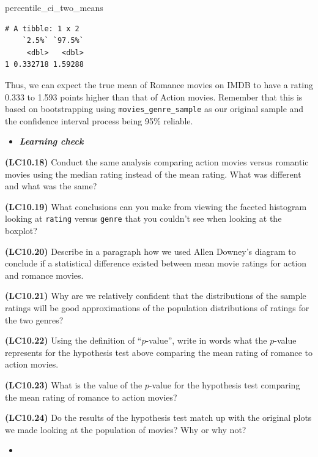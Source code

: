 \documentclass[12pt, krantz2,]{krantz}
\makeatletter
\newenvironment{Shaded}{\begin{snugshade}}{\end{snugshade}}
\newcommand{\NormalTok}[1]{#1}
\newenvironment{kframe}{%
\medskip{}
\setlength{\fboxsep}{.8em}
 \def\at@end@of@kframe{}%
 \ifinner\ifhmode%
  \def\at@end@of@kframe{\end{minipage}}%
  \begin{minipage}{\columnwidth}%
 \fi\fi%
 \def\FrameCommand##1{\hskip\@totalleftmargin \hskip-\fboxsep
 \colorbox{shadecolor}{##1}\hskip-\fboxsep
     \hskip-\linewidth \hskip-\@totalleftmargin \hskip\columnwidth}%
 \MakeFramed {\advance\hsize-\width
   \@totalleftmargin\z@ \linewidth\hsize
   \@setminipage}}%
 {\par\unskip\endMakeFramed%
 \at@end@of@kframe}
\renewenvironment{Shaded}{\begin{kframe}}{\end{kframe}}
\newenvironment{rmdblock}[1]
  {\begin{shaded*}
  \begin{itemize}
  \renewcommand{\labelitemi}{
    \raisebox{-.7\height}[0pt][0pt]{
    }
  }
  \item
  }
  {
  \end{itemize}
  \end{shaded*}
  }
\newenvironment{learncheck}
  {\begin{rmdblock}{warning}}
  {\end{rmdblock}}
\makeatother
\begin{document}
\begin{Shaded}
\begin{Highlighting}[]
\NormalTok{percentile_ci_two_means}
\end{Highlighting}
\end{Shaded}

\begin{verbatim}
# A tibble: 1 x 2
    `2.5%` `97.5%`
     <dbl>   <dbl>
1 0.332718 1.59288
\end{verbatim}

Thus, we can expect the true mean of Romance movies on IMDB to have a rating 0.333 to 1.593 points higher than that of Action movies. Remember that this is based on bootstrapping using \texttt{movies\_genre\_sample} as our original sample and the confidence interval process being 95\% reliable.

\begin{learncheck}
\textbf{\emph{Learning check}}
\end{learncheck}

\textbf{(LC10.18)} Conduct the same analysis comparing action movies versus romantic movies using the median rating instead of the mean rating. What was different and what was the same?

\textbf{(LC10.19)} What conclusions can you make from viewing the faceted histogram looking at \texttt{rating} versus \texttt{genre} that you couldn't see when looking at the boxplot?

\textbf{(LC10.20)} Describe in a paragraph how we used Allen Downey's diagram to conclude if a statistical difference existed between mean movie ratings for action and romance movies.

\textbf{(LC10.21)} Why are we relatively confident that the distributions of the sample ratings will be good approximations of the population distributions of ratings for the two genres?

\textbf{(LC10.22)} Using the definition of ``\(p\)-value'', write in words what the \(p\)-value represents for the hypothesis test above comparing the mean rating of romance to action movies.

\textbf{(LC10.23)} What is the value of the \(p\)-value for the hypothesis test comparing the mean rating of romance to action movies?

\textbf{(LC10.24)} Do the results of the hypothesis test match up with the original plots we made looking at the population of movies? Why or why not?

\begin{learncheck}

\end{learncheck}
\end{document}
